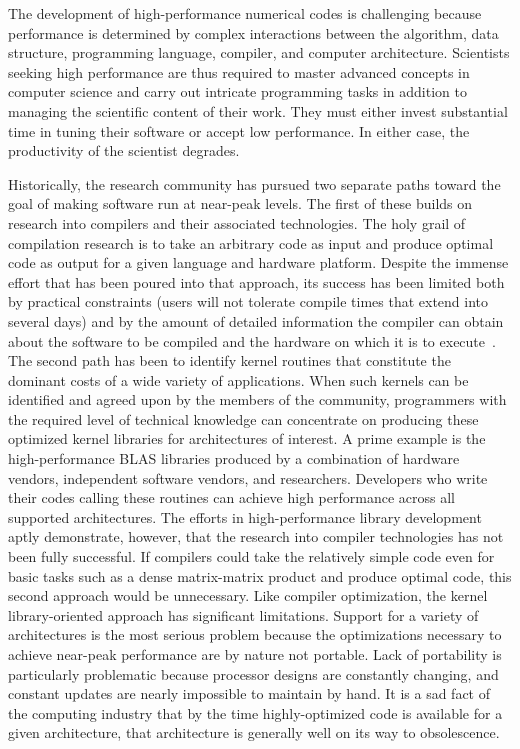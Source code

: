 \documentclass[11pt]{article}
\begin{document}
The development of high-performance numerical codes is challenging because performance is determined by complex interactions between the algorithm, data structure, programming language, compiler, and computer architecture. Scientists seeking high performance are thus required to master advanced concepts in computer science and carry out intricate programming tasks in addition to managing the scientific content of their work.  They must either invest substantial time in tuning their software or accept low performance. In either case, the productivity of the scientist degrades.

Historically, the research community has pursued two separate paths toward the goal of making software run at near-peak levels.  The first of these builds on research into compilers and their associated technologies.  The holy grail of compilation research is to take an arbitrary code as input and produce optimal code as output for a given language and hardware platform.  Despite the immense effort that has been poured into that approach, its success has been limited both by practical constraints (users will not tolerate compile times that extend into several days) and by the amount of detailed information the compiler can obtain about the software to be compiled and the hardware on which it is to execute~\cite{Ken99,Wol89,Wol96}.    The second path has been to identify kernel routines that constitute the dominant costs of a wide variety of applications.  When such kernels can be identified and agreed upon by the members of the community, programmers with the required level of technical knowledge can concentrate on producing these optimized kernel libraries for architectures of interest. A prime example is the high-performance BLAS libraries produced by a combination of hardware vendors, independent software vendors, and researchers.  Developers who write their codes calling these routines can achieve high performance across all supported architectures. The efforts in high-performance library development aptly demonstrate, however, that the research into compiler technologies has not been fully successful.  If compilers could take the relatively simple code even for basic tasks such as a dense matrix-matrix product and produce optimal code, this second approach would be unnecessary.    Like compiler optimization, the kernel library-oriented approach has significant limitations.  Support for a variety of architectures is the most serious problem because the optimizations necessary to achieve near-peak performance are by nature not portable.   Lack of portability is particularly problematic because processor designs are constantly changing,  and constant updates are nearly impossible to maintain by hand.  It is a sad fact of the computing industry that by the time highly-optimized code is available for a given architecture, that architecture is generally well on its way to obsolescence.   
\end{document}

